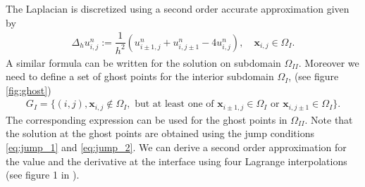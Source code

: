 \documentclass[10pt,a4paper,twoside, french]{article}
\numberwithin{equation}{section}
\numberwithin{figure}{section}
\numberwithin{table}{section}
\newcommand{\bx}{\mathbf{x}}
\begin{document}
The Laplacian is discretized using a second order accurate approximation given by 
\begin{align}
\Delta_h u_{i,j}^n := \dfrac{1}{h^2}\left( u_{i\pm1,j}^n+u_{i,j\pm1}^n-4u_{i,j}^n\right), \quad \bx_{i,j}\in\Omega_I.
\label{eq:laplace}
\end{align}
A similar formula can be written for the solution on subdomain $\Omega_{II}$. Moreover we need to define a set of ghost points for the interior subdomain $\Omega_{I}$, (see figure \ref{fig:ghost})
\begin{align}
G_I = \lbrace (i,j), \bx_{i,j}\notin \Omega_I, \text{ but at least one of } \bx_{i\pm1,j}\in\Omega_I \text{ or } \bx_{i,j\pm1}\in\Omega_I\rbrace.
\end{align}
The corresponding expression can be used for the ghost points in $\Omega_{II}$. Note that the solution at the ghost points are obtained using the jump conditions \eqref{eq:jump_1} and \eqref{eq:jump_2}. We can derive a second order approximation for the value and the derivative at the interface using four Lagrange interpolations (see figure 1 in \cite{main_paper}).

\begin{center}
\vspace{.5cm}
\begin{minipage}[c]{0.4\textwidth}
\end{minipage}
\label{fig:ghost}
\end{center}
\end{document}
